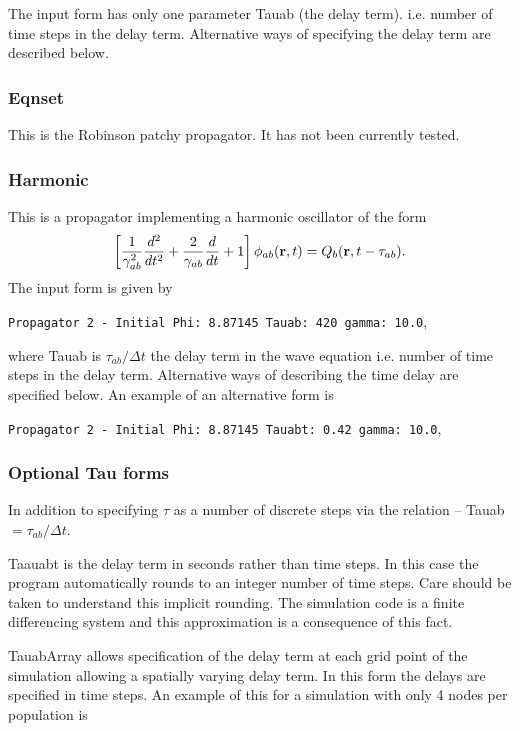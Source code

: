 \documentclass[12pt,a4paper]{article}
\begin{document}
The input form has only one parameter Tauab (the delay term).
i.e. number of time steps in the delay term. Alternative ways of specifying
the delay term are described below.

\subsubsection{Eqnset}

This is the Robinson patchy propagator. It has not been currently tested.

\subsubsection{Harmonic}
This is a propagator implementing a harmonic oscillator of the form
\begin{equation}
\left[\frac{1}{\gamma_{ab}^2}\frac{d^2}{d t^2}+\frac{2}{\gamma_{ab}}\frac{d}
{d t}+1 \right] \phi_{ab}({\bf r},t)
=Q_b({\bf r},t-\tau_{ab}).
\end{equation}
The input form is given by 

{\tt \small Propagator 2 - Initial Phi: 8.87145 Tauab: 420 gamma: 10.0},

where Tauab is $\tau_{ab}/ \Delta t$ the delay term in the wave equation
i.e. number of time steps in the delay term. Alternative ways of describing
the time delay are specified below. An example of an alternative form is

{\tt \small Propagator 2 - Initial Phi: 8.87145 Tauabt: 0.42 gamma: 10.0},

\subsubsection{Optional Tau forms}

In addition to specifying $\tau$ as a number of discrete steps via the
relation -- Tauab $= \tau_{ab}/ \Delta t$.

Taauabt is the delay term in seconds rather than time steps.
In this case the program automatically rounds to an integer number
of time steps. Care should be taken to understand this implicit rounding.
The simulation code is a finite differencing system and this approximation
is a consequence of this fact.

TauabArray allows specification of the delay term at each grid point
of the simulation allowing a spatially varying delay term. In this form
the delays are specified in time steps. An example of this for a simulation
with only 4 nodes per population is
\end{document}
